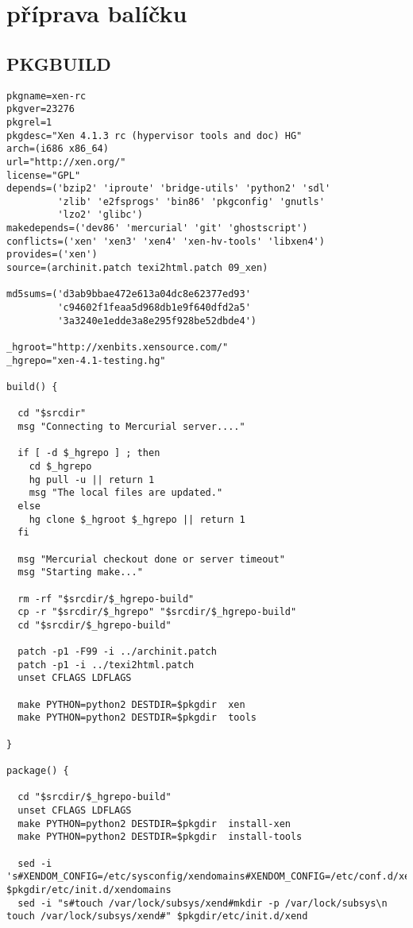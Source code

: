 \chapter{\xen příprava balíčku}
\section{PKGBUILD}
\label{xenpkgbuild}
\begin{lstlisting}
pkgname=xen-rc
pkgver=23276
pkgrel=1
pkgdesc="Xen 4.1.3 rc (hypervisor tools and doc) HG"
arch=(i686 x86_64)
url="http://xen.org/"
license="GPL"
depends=('bzip2' 'iproute' 'bridge-utils' 'python2' 'sdl'
         'zlib' 'e2fsprogs' 'bin86' 'pkgconfig' 'gnutls'
         'lzo2' 'glibc')
makedepends=('dev86' 'mercurial' 'git' 'ghostscript')
conflicts=('xen' 'xen3' 'xen4' 'xen-hv-tools' 'libxen4')
provides=('xen')
source=(archinit.patch texi2html.patch 09_xen)

md5sums=('d3ab9bbae472e613a04dc8e62377ed93'
         'c94602f1feaa5d968db1e9f640dfd2a5'
         '3a3240e1edde3a8e295f928be52dbde4')
			   
_hgroot="http://xenbits.xensource.com/"
_hgrepo="xen-4.1-testing.hg"

build() {

  cd "$srcdir"
  msg "Connecting to Mercurial server...."

  if [ -d $_hgrepo ] ; then
    cd $_hgrepo
    hg pull -u || return 1
    msg "The local files are updated."
  else
    hg clone $_hgroot $_hgrepo || return 1
  fi

  msg "Mercurial checkout done or server timeout"
  msg "Starting make..."

  rm -rf "$srcdir/$_hgrepo-build"
  cp -r "$srcdir/$_hgrepo" "$srcdir/$_hgrepo-build"
  cd "$srcdir/$_hgrepo-build"

  patch -p1 -F99 -i ../archinit.patch
  patch -p1 -i ../texi2html.patch
  unset CFLAGS LDFLAGS

  make PYTHON=python2 DESTDIR=$pkgdir  xen
  make PYTHON=python2 DESTDIR=$pkgdir  tools  
    
}

package() {

  cd "$srcdir/$_hgrepo-build"
  unset CFLAGS LDFLAGS
  make PYTHON=python2 DESTDIR=$pkgdir  install-xen
  make PYTHON=python2 DESTDIR=$pkgdir  install-tools  
  
  sed -i 's#XENDOM_CONFIG=/etc/sysconfig/xendomains#XENDOM_CONFIG=/etc/conf.d/xendomains#' $pkgdir/etc/init.d/xendomains
  sed -i "s#touch /var/lock/subsys/xend#mkdir -p /var/lock/subsys\n     touch /var/lock/subsys/xend#" $pkgdir/etc/init.d/xend


\end{lstlisting}
